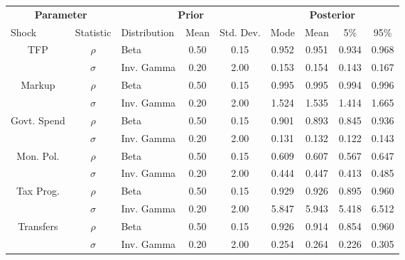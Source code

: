 \begin{tabular}{lclcccccc}
    \toprule
    \multicolumn{2}{c}{\textbf{Parameter}} & \multicolumn{3}{c}{\textbf{Prior}} & \multicolumn{4}{c}{\textbf{Posterior}} \\
    \cmidrule(lr){1-2} \cmidrule(lr){3-5} \cmidrule(lr){6-9}
    Shock & Statistic & Distribution & Mean & Std. Dev. & Mode & Mean & 5\% & 95\% \\
    \midrule
    \multicolumn{1}{c}{\multirow{2}{*}{TFP}} & $\rho$ & Beta & 0.50 & 0.15 & 0.952 & 0.951 & 0.934 & 0.968 \\
    & $\sigma$ & Inv. Gamma & 0.20 & 2.00 & 0.153 & 0.154 & 0.143 & 0.167 \\
    \cmidrule(lr){1-2}
    \multicolumn{1}{c}{\multirow{2}{*}{Markup}} & $\rho$ & Beta & 0.50 & 0.15 & 0.995 & 0.995 & 0.994 & 0.996 \\
    & $\sigma$ & Inv. Gamma & 0.20 & 2.00 & 1.524 & 1.535 & 1.414 & 1.665 \\
    \cmidrule(lr){1-2}
    \multicolumn{1}{c}{\multirow{2}{*}{Govt. Spend}} & $\rho$ & Beta & 0.50 & 0.15 & 0.901 & 0.893 & 0.845 & 0.936 \\
    & $\sigma$ & Inv. Gamma & 0.20 & 2.00 & 0.131 & 0.132 & 0.122 & 0.143 \\
    \cmidrule(lr){1-2}
    \multicolumn{1}{c}{\multirow{2}{*}{Mon. Pol.}} & $\rho$ & Beta & 0.50 & 0.15 & 0.609 & 0.607 & 0.567 & 0.647 \\
    & $\sigma$ & Inv. Gamma & 0.20 & 2.00 & 0.444 & 0.447 & 0.413 & 0.485 \\
    \cmidrule(lr){1-2}
    \multicolumn{1}{c}{\multirow{2}{*}{Tax Prog.}} & $\rho$ & Beta & 0.50 & 0.15 & 0.929 & 0.926 & 0.895 & 0.960 \\
    & $\sigma$ & Inv. Gamma & 0.20 & 2.00 & 5.847 & 5.943 & 5.418 & 6.512 \\
    \cmidrule(lr){1-2}
    \multicolumn{1}{c}{\multirow{2}{*}{Transfers}} & $\rho$ & Beta & 0.50 & 0.15 & 0.926 & 0.914 & 0.854 & 0.960 \\
    & $\sigma$ & Inv. Gamma & 0.20 & 2.00 & 0.254 & 0.264 & 0.226 & 0.305 \\
    \bottomrule
\end{tabular}
